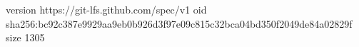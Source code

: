 version https://git-lfs.github.com/spec/v1
oid sha256:bc92c387e9929aa9eb0b926d3f97e09c815c32bca04bd350f2049de84a02829f
size 1305
